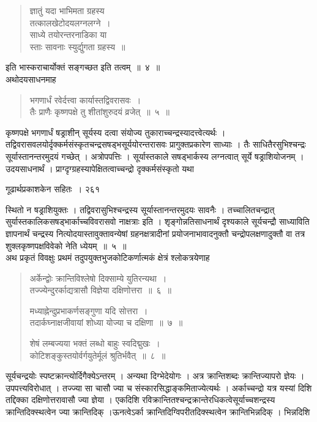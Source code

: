 \documentclass[11pt, openany]{book}
\begin{document}
\begin{quote}
{\qt ज्ञातुं यदा भाभिमता ग्रहस्य \\
तत्कालखेटोदयलग्नलग्ने~। \\
साध्ये तयोरन्तरनाडिका या \\
स्ताः सावनाः स्युर्द्युगता ग्रहस्य~॥}
\end{quote}
 इति भास्कराचार्योक्तं सङ्गच्छत इति तत्वम्~॥~४~॥\\
\noindent  अथोदयसाधनमाह \textendash

\begin{quote}
{\ssi भगणार्धं रवेर्दत्त्वा कार्यास्तद्विवरासवः~।\\
 तैः प्राणैः कृष्णपक्षे तु शीतांशुरुदयं व्रजेत्~॥~५~॥}
\end{quote}
 कृष्णपक्षे भगणार्धं षड्राशीन् सूर्यस्य दत्वा संयोज्य तुकाराच्चन्द्रस्यादत्त्वेत्यर्थः । तद्विवरासवलयोर्दृक्कर्मसंस्कृतचन्द्रसषड्भसूर्ययोरन्तरासवः प्रागुक्तप्रकारेण साध्याः । तैः साधितैरसुभिश्चन्द्रः सूर्यास्तानन्तरमुदयं गच्छेत् । अत्रोपपत्तिः । सूर्यास्तकाले सषड्भार्कस्य लग्नत्वात् सूर्ये षड्राशियोजनम् । उदयसाधनार्थं । प्राग्दृग्ग्रहस्यापेक्षितत्वाच्चन्द्रो दृक्कर्मसंस्कृतो यथा


 
\newpage
 

\hspace{3cm} गूढार्थप्रकाशकेन सहितः~। \hfill २६१
\vspace{1cm}


\noindent स्थितो न षड्राशियुक्तः । तद्विवरासुभिश्चन्द्रस्य सूर्यास्तानन्तरमुदयः सावनैः । तच्चालितचन्द्रात् सुर्यास्तकालिकसषड्भार्काच्चविवरासवो नाक्षत्राः इति । शृङ्गोन्नतिसाधनार्थं दृश्यकाले सूर्यचन्द्रौ साध्याविति ज्ञापनार्थं चन्द्रस्य नित्योदयास्तावुक्तावन्येषां ग्रहनक्षत्रादीनां प्रयोजनाभावादनुक्तौ चन्द्रोपलक्षणादुक्तौ वा तत्र शुक्लकृष्णपक्षविवेको नेति ध्येयम्~॥~५~॥\\
\noindent अथ प्रकृतं विवक्षुः प्रथमं तदुपयुक्तभुजकोटिकर्णात्मकं क्षेत्रं श्लोकत्रयेणाह \textendash

\begin{quote}
{\ssi अर्केन्द्वोः क्रान्तिविश्लेषो दिक्साम्ये युतिरन्यथा~। \\
तज्ज्येन्दुरर्काद्यत्रासौ विज्ञेया दक्षिणोत्तरा~॥~६~॥

मध्याह्नेन्दुप्रभाकर्णसङ्गुणा यदि सोत्तरा~। \\
तदार्कघ्नाक्षजीवायां शोध्या योज्या च दक्षिणा~॥~७~॥

शेषं लम्बज्यया भक्तं लब्धो बाहुः स्वदिद्मुखः~। \\
कोटिशङ्कुस्तयोर्वर्गयुतेर्मूलं श्रुतिर्भवैत्~॥~८~॥}
\end{quote}
 सूर्यचन्द्रयोः स्पष्टक्रान्त्योर्दिगैक्येऽन्तरम् । अन्यथा दिग्भेदेयोगः । अत्र क्रान्तिशब्दः क्रान्तिज्यापरो ज्ञेयः । उपपत्त्यविरोधात् । तज्ज्या सा चासौ ज्या च संस्कारसिद्धाङ्कमिताज्येत्यर्थः । अर्काच्चन्द्रो यत्र यस्यां दिशि तद्दिक्का दक्षिणोत्तरावासौ ज्या ज्ञेया । एकदिशि रविक्रान्तितश्चन्द्रक्रान्तेरधिकत्वेसूर्याच्चशन्द्रस्य क्रान्तिदिक्स्थत्वेन ज्या क्रान्तिदिक् ।ऊनत्वेऽर्का क्रान्तिदिग्विपरीतदिक्स्थत्वेन क्रान्तिभिन्नदिक् । भिन्नदिशि \textendash
\end{document}
